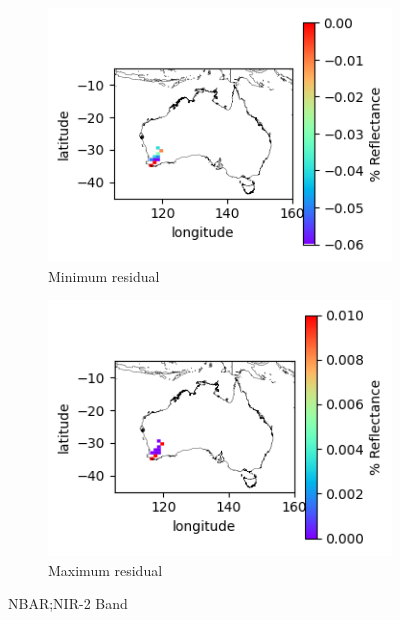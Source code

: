 \documentclass[a4paper]{article}
\begin{document}
      \begin{figure}[h!]
        \centering
          \begin{subfigure}[l]{.4\linewidth}
            \hspace{-32mm}
            \includegraphics[scale=0.9]{plots/nbar/nbar_nir_2-MinResidual.png}
            \caption{Minimum residual}
          \end{subfigure}
%
          \begin{subfigure}[r]{.4\linewidth}
            \includegraphics[scale=0.9]{plots/nbar/nbar_nir_2-MaxResidual.png}
            \caption{Maximum residual}
          \end{subfigure}
        \caption{NBAR;\@ NIR-2 Band}\label{figure:18}
      \end{figure}

  \clearpage
\end{document}
